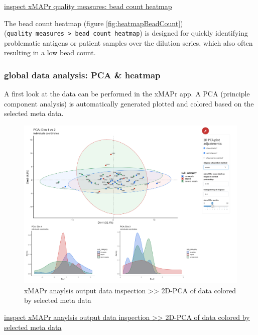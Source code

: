 \documentclass[
]{book}
\begin{document}
\href{figures/quality_measures__bead_count_heatmap.png}{inspect xMAPr quality measures: bead count heatmap}

The bead count heatmap (figure \ref{fig:heatmapBeadCount}) (\texttt{quality\ measures\ \textgreater{}\ bead\ count\ heatmap}) is designed for quickly identifying problematic antigens or patient samples over the dilution series, which also often resulting in a low bead count.

\hypertarget{global-data-analysis-pca-heatmap}{%
\subsubsection{global data analysis: PCA \& heatmap}\label{global-data-analysis-pca-heatmap}}

A first look at the data can be performed in the xMAPr app. A PCA (principle component analysis) is automatically generated plotted and colored based on the selected meta data.

\begin{figure}

{\centering \includegraphics[width=42.36in]{figures/global_result_overview_PCA} 

}

\caption{xMAPr anaylsis output data inspection >> 2D-PCA of data colored by selected meta data}\label{fig:PCA2D}
\end{figure}

\href{figures/global_result_overview_PCA.png}{inspect xMAPr anaylsis output data inspection \textgreater\textgreater{} 2D-PCA of data colored by selected meta data}
\end{document}
